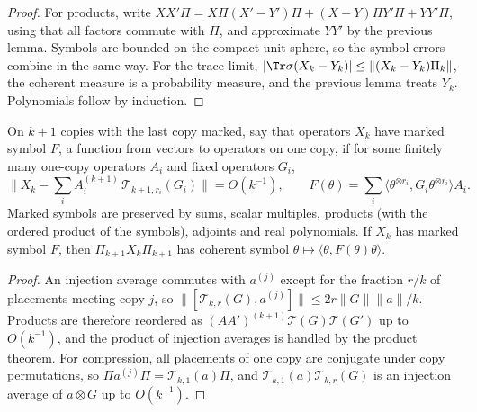 \begin{proof}\leanok
    For products, write
    $XX'\Pi=X\Pi(X'-Y')\Pi+(X-Y)\Pi Y'\Pi+YY'\Pi$, using that all factors commute with
    $\Pi$, and approximate $YY'$ by the previous lemma. Symbols are bounded on the compact
    unit sphere, so the symbol errors combine in the same way. For the trace limit,
    $|\Tr\sigma(X_k-Y_k)|\le\|(X_k-Y_k)\Pi_k\|$, the coherent measure is a probability measure,
    and the previous lemma treats $Y_k$. Polynomials follow by induction.
\end{proof}

\begin{theorem}
    \label{thm:marked_symbol}
    \leanok
    On $k+1$ copies with the last copy marked, say that operators $X_k$ have marked symbol
    $F$, a function from vectors to operators on one copy, if for some finitely many
    one-copy operators $A_i$ and fixed operators $G_i$,
    \[
        \Big\|X_k-\sum_i A_i^{(k+1)}\,\mathcal T_{k+1,r_i}(G_i)\Big\|=O(k^{-1}),\qquad
        F(\theta)=\sum_i\langle\theta^{\otimes r_i},G_i\theta^{\otimes r_i}\rangle A_i .
    \]
    Marked symbols are preserved by sums, scalar multiples, products (with the ordered
    product of the symbols), adjoints and real polynomials. If $X_k$ has marked symbol $F$,
    then $\Pi_{k+1}X_k\Pi_{k+1}$ has coherent symbol $\theta\mapsto\langle\theta,F(\theta)\theta\rangle$.
\end{theorem}

\begin{proof}\leanok
    An injection average commutes with $a^{(j)}$ except for the fraction $r/k$ of placements
    meeting copy $j$, so $\|[\mathcal T_{k,r}(G),a^{(j)}]\|\le 2r\|G\|\|a\|/k$. Products are
    therefore reordered as $(AA')^{(k+1)}\mathcal T(G)\mathcal T(G')$ up to $O(k^{-1})$, and
    the product of injection averages is handled by the product theorem. For compression,
    all placements of one copy are conjugate under copy permutations, so
    $\Pi a^{(j)}\Pi=\mathcal T_{k,1}(a)\Pi$, and $\mathcal T_{k,1}(a)\mathcal T_{k,r}(G)$
    is an injection average of $a\otimes G$ up to $O(k^{-1})$.
\end{proof}


